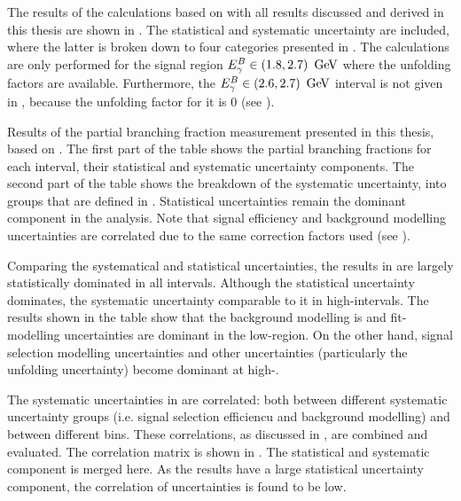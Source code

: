 The results of the calculations based on  with all 
results discussed and derived in this thesis are shown in .
The statistical and systematic uncertainty are included, where the latter is broken down to four categories presented in .
The calculations are only performed for the signal region ${E^B_{\gamma}}\in(1.8,2.7)~\mathrm{\,Ge\kern -0.1em V}$ where the unfolding factors are available.
Furthermore, the ${E^B_{\gamma}}\in(2.6,2.7)~\mathrm{\,Ge\kern -0.1em V}$ interval is not given in , 
because the unfolding factor for it is 0 (see ).

\begin{table}[htbp!]
    \centering
    \caption{\label{tab:partial_branching_fractions}
    Results of the partial branching fraction measurement presented in this thesis, based on . 
    The first part of the table shows the partial branching fractions for each \EB interval, their statistical and systematic uncertainty components.
    The second part of the table shows the breakdown of the systematic uncertainty, into groups that are defined in . 
    Statistical uncertainties remain the dominant component in the analysis.
    Note that signal efficiency and background modelling uncertainties are correlated due to the same correction factors used (see ).
    }
    
\end{table}

Comparing the systematical and statistical uncertainties, the results in  
are largely statistically dominated in all \EB intervals.
Although the statistical uncertainty dominates, the systematic uncertainty comparable to it in high-\EB intervals.
The results shown in the table show that the background modelling is
and fit-modelling uncertainties are dominant in the low-\EB region.
On the other hand, signal selection modelling uncertainties and other uncertainties (particularly the unfolding uncertainty) become dominant at high-\EB.

The systematic uncertainties in  are correlated:
both between different systematic uncertainty groups (i.e. signal selection efficiencu and background modelling)
and between different \EB bins.
These correlations, as discussed in , are combined and evaluated.
The correlation matrix is shown in .
The statistical and systematic component is merged here.
As the results have a large statistical uncertainty component, the correlation of uncertainties is found to be low.

